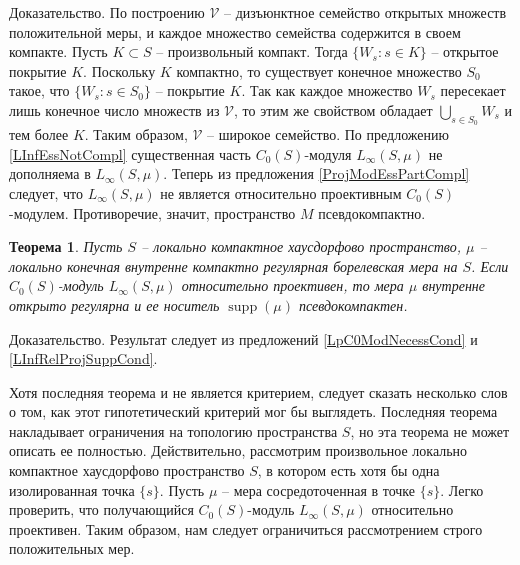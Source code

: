 \documentclass[12pt]{article}
\numberwithin{equation}{subsection}
\theoremstyle{plain}
\newtheorem{theorem}{Теорема}
\newenvironment{proof}{Доказательство.}{}
\begin{document}
\begin{fulltext}
\begin{proof}
        По построению $\mathcal{V}$ -- дизъюнктное семейство открытых множеств положительной меры, и каждое множество семейства содержится в своем компакте. Пусть $K\subset S$ -- произвольный компакт. Тогда $\{W_s:s\in K\}$ -- открытое покрытие $K$. Поскольку $K$ компактно, то существует конечное множество $S_0$ такое, что $\{W_s:s\in S_0\}$ -- покрытие $K$. Так как каждое множество $W_s$ пересекает лишь конечное число множеств из $\mathcal{V}$, то этим же свойством обладает $\bigcup_{s\in S_0}W_s$ и тем более $K$. Таким образом, $\mathcal{V}$ -- широкое семейство. По предложению \ref{LInfEssNotCompl} существенная часть $C_0(S)$-модуля $L_\infty(S,\mu)$ не дополняема в $L_\infty(S,\mu)$. Теперь из предложения \ref{ProjModEssPartCompl} следует, что $L_\infty(S,\mu)$ не является относительно проективным $C_0(S)$-модулем. Противоречие, значит, пространство $M$ псевдокомпактно.
    \end{proof}

    \begin{theorem}\label{LInfReProjNecessCond} Пусть $S$ -- локально компактное хаусдорфово пространство, $\mu$ -- локально конечная внутренне компактно регулярная борелевская мера на $S$. Если $C_0(S)$-модуль $L_\infty(S,\mu)$ относительно проективен, то мера $\mu$ внутренне открыто регулярна и ее носитель $\operatorname{supp}(\mu)$ псевдокомпактен.

    \end{theorem}
    \begin{proof} Результат следует из предложений \ref{LpC0ModNecessCond} и \ref{LInfRelProjSuppCond}.
    \end{proof}

    Хотя последняя теорема и не является критерием, следует сказать несколько слов о том, как этот гипотетический критерий мог бы выглядеть. Последняя теорема накладывает ограничения на топологию пространства $S$, но эта теорема не может описать ее полностью. Действительно, рассмотрим произвольное локально компактное хаусдорфово пространство $S$, в котором есть хотя бы одна изолированная точка $\{s\}$. Пусть $\mu$ -- мера сосредоточенная в точке $\{s\}$. Легко проверить, что получающийся $C_0(S)$-модуль $L_\infty(S,\mu)$ относительно проективен. Таким образом, нам следует ограничиться рассмотрением строго положительных мер.


\end{fulltext}
\end{document}
